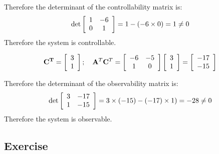 Therefore the determinant of the controllability matrix is:
\[
\det \left[ {\begin{array}{*{20}c}
   1 & { - 6}  \\
   0 & 1  \\
\end{array}} \right] = 1 - ( - 6 \times 0) = 1 \ne 0
\]
Therefore the system is controllable.
 
\[
{\bf{C}^T} = \left[ {\begin{array}{*{20}c}
   3  \\
   1  \\
\end{array}} \right];\quad {\bf A}^T{\bf C}^T = \left[ {\begin{array}{*{20}c}
   { - 6} & { - 5}  \\
   1 & 0  \\
\end{array}} \right]\left[ {\begin{array}{*{20}c}
   3  \\
   1  \\
\end{array}} \right] = \left[ {\begin{array}{*{20}c}
   { -17 }  \\
   { -15 }  \\
\end{array}} \right]
\]

Therefore the determinant of the observability matrix is:
\[
\det \left[ {\begin{array}{*{20}c}
   3 & { -17 }  \\
   1 & { -15 }  \\
\end{array}} \right] = 3\times(-15) - (-17) \times 1) = -28 \ne 0
\]
Therefore the system is observable.


\subsection*{Exercise} %
\label{sub:exercise}

